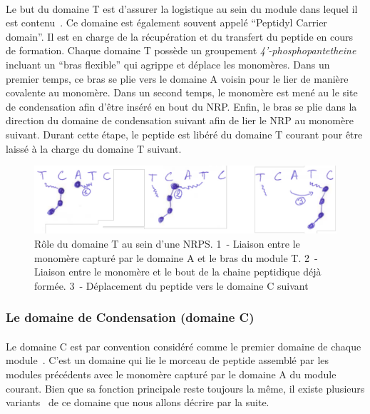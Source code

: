 \documentclass[12pt,french,twoside]{report}
\begin{document}
\paragraph{}Le but du domaine T est d'assurer la logistique au sein du module dans lequel il est contenu~\cite{stachelhaus_biochemical_1996,calcott_portability_2015}.
Ce domaine est également souvent appelé ``Peptidyl Carrier domain''.
Il est en charge de la récupération et du transfert du peptide en cours de formation.
Chaque domaine T possède un groupement \textit{4’-phosphopantetheine} incluant un ``bras flexible'' qui agrippe et déplace les monomères.
Dans un premier temps, ce bras se plie vers le domaine A voisin pour le lier de manière covalente au monomère.
Dans un second temps, le monomère est mené au le site de condensation afin d'être inséré en bout du NRP.
Enfin, le bras se plie dans la direction du domaine de condensation suivant afin de lier le NRP au monomère suivant.
Durant cette étape, le peptide est libéré du domaine T courant pour être laissé à la charge du domaine T suivant.

\begin{figure}[h!]
  \begin{center}
    \includegraphics[width=450px]{Figures/bio/Intro/domaineT.pdf}
    \caption{\label{T_domain}Rôle du domaine T au sein d'une NRPS.
    1~- Liaison entre le monomère capturé par le domaine A et le bras du module T.
    2~- Liaison entre le monomère et le bout de la chaine peptidique déjà formée.
    3~- Déplacement du peptide vers le domaine C suivant}
  \end{center}
\end{figure}

\subsubsection{Le domaine de Condensation (domaine C)}

\paragraph{}Le domaine C est par convention considéré comme le premier domaine de chaque module~\cite{stachelhaus_peptide_1998}.
C'est un domaine qui lie le morceau de peptide assemblé par les modules précédents avec le monomère capturé par le domaine A du module courant.
Bien que sa fonction principale reste toujours la même, il existe plusieurs variants~\cite{rausch_phylogenetic_2007} de ce domaine que nous allons décrire par la suite.
\end{document}
